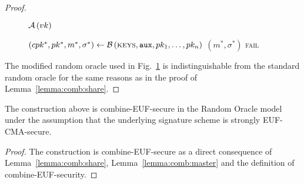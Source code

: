 \begin{proof}
\begin{figure}[!htbp]
\begin{algobox}{$\mathcal{A}\left(vk\right)$}
\begin{algorithmic}[1]
            \State $\left(cpk^*, pk^*, m^*, \sigma^*\right) \gets
            \mathcal{B}\left(\textsc{keys}, \mathtt{aux}, pk_1, \dots,
            pk_n\right)$
             
              \State \Return $\left(m^*, \sigma^*\right)$
            \Else
              \State \Return \textsc{fail}
            \EndIf
          \end{algorithmic}
        \end{algobox}
        \caption{}
        \label{proof:comb:master:distinguisher}
      \end{figure}

      The modified random oracle used in
      Fig.~\ref{proof:comb:master:distinguisher} is indistinguishable from the
      standard random oracle for the same reasons as in the proof of
      Lemma~\ref{lemma:comb:share}.
    \end{proof}

    \begin{theorem}
      \label{thm:combsign}
      The construction above is \textsf{combine-EUF}-secure in the Random Oracle
      model under the assumption that the underlying signature scheme is
      strongly \textsf{EUF-CMA}-secure.
    \end{theorem}

    \begin{proof}
      The construction is \textsf{combine-EUF}-secure as a direct consequence of
      Lemma~\ref{lemma:comb:share}, Lemma~\ref{lemma:comb:master} and the
      definition of \textsf{combine-EUF}-security.
    \end{proof}
